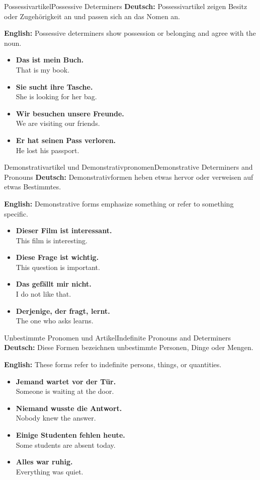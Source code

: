 \documentclass[a4paper,11pt]{article}
\newcommand{\GermanText}[1]{\textbf{Deutsch: }#1\par}
\newcommand{\EnglishText}[1]{{\color{SoftGray}\textbf{English: }#1\par}}
\newcommand{\ExampleItem}[2]{\item \textbf{#1}\\{\color{SoftGray}#2}}
\begin{document}
\begin{grammarentry}{Possessivartikel}{Possessive Determiners}
    \GermanText{Possessivartikel zeigen Besitz oder Zugehörigkeit an und passen sich an das Nomen an.}
    \EnglishText{Possessive determiners show possession or belonging and agree with the noun.}
    \begin{exbox}
        \begin{itemize}
            \ExampleItem{Das ist mein Buch.}{That is my book.}
            \ExampleItem{Sie sucht ihre Tasche.}{She is looking for her bag.}
            \ExampleItem{Wir besuchen unsere Freunde.}{We are visiting our friends.}
            \ExampleItem{Er hat seinen Pass verloren.}{He lost his passport.}
        \end{itemize}
    \end{exbox}
\end{grammarentry}

\begin{grammarentry}{Demonstrativartikel und Demonstrativpronomen}{Demonstrative Determiners and Pronouns}
    \GermanText{Demonstrativformen heben etwas hervor oder verweisen auf etwas Bestimmtes.}
    \EnglishText{Demonstrative forms emphasize something or refer to something specific.}
    \begin{exbox}
        \begin{itemize}
            \ExampleItem{Dieser Film ist interessant.}{This film is interesting.}
            \ExampleItem{Diese Frage ist wichtig.}{This question is important.}
            \ExampleItem{Das gefällt mir nicht.}{I do not like that.}
            \ExampleItem{Derjenige, der fragt, lernt.}{The one who asks learns.}
        \end{itemize}
    \end{exbox}
\end{grammarentry}

\begin{grammarentry}{Unbestimmte Pronomen und Artikel}{Indefinite Pronouns and Determiners}
    \GermanText{Diese Formen bezeichnen unbestimmte Personen, Dinge oder Mengen.}
    \EnglishText{These forms refer to indefinite persons, things, or quantities.}
    \begin{exbox}
        \begin{itemize}
            \ExampleItem{Jemand wartet vor der Tür.}{Someone is waiting at the door.}
            \ExampleItem{Niemand wusste die Antwort.}{Nobody knew the answer.}
            \ExampleItem{Einige Studenten fehlen heute.}{Some students are absent today.}
            \ExampleItem{Alles war ruhig.}{Everything was quiet.}
        \end{itemize}
    \end{exbox}
\end{grammarentry}
\end{document}
